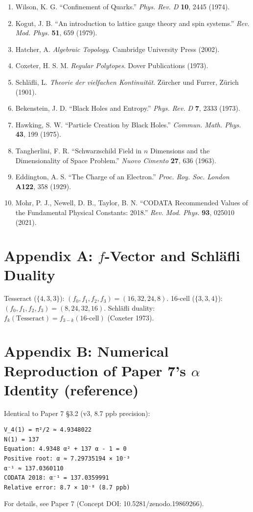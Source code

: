 \documentclass[a4paper,11pt]{article}
\begin{document}
\begin{enumerate}
\item Wilson, K. G. ``Confinement of Quarks.'' \textit{Phys. Rev. D} \textbf{10}, 2445 (1974).
\item Kogut, J. B. ``An introduction to lattice gauge theory and spin systems.'' \textit{Rev. Mod. Phys.} \textbf{51}, 659 (1979).
\item Hatcher, A. \textit{Algebraic Topology}. Cambridge University Press (2002).
\item Coxeter, H. S. M. \textit{Regular Polytopes}. Dover Publications (1973).
\item Schl\"afli, L. \textit{Theorie der vielfachen Kontinuit\"at}. Z\"urcher und Furrer, Z\"urich (1901).
\item Bekenstein, J. D. ``Black Holes and Entropy.'' \textit{Phys. Rev. D} \textbf{7}, 2333 (1973).
\item Hawking, S. W. ``Particle Creation by Black Holes.'' \textit{Commun. Math. Phys.} \textbf{43}, 199 (1975).
\item Tangherlini, F. R. ``Schwarzschild Field in $n$ Dimensions and the Dimensionality of Space Problem.'' \textit{Nuovo Cimento} \textbf{27}, 636 (1963).
\item Eddington, A. S. ``The Charge of an Electron.'' \textit{Proc. Roy. Soc. London} \textbf{A122}, 358 (1929).
\item Mohr, P. J., Newell, D. B., Taylor, B. N. ``CODATA Recommended Values of the Fundamental Physical Constants: 2018.'' \textit{Rev. Mod. Phys.} \textbf{93}, 025010 (2021).
\end{enumerate}

\section*{Appendix A: $f$-Vector and Schl\"afli Duality}

Tesseract ($\{4,3,3\}$): $(f_0, f_1, f_2, f_3) = (16, 32, 24, 8)$.
16-cell ($\{3,3,4\}$): $(f_0, f_1, f_2, f_3) = (8, 24, 32, 16)$.
Schl\"afli duality: $f_k(\text{Tesseract}) = f_{3-k}(\text{16-cell})$ (Coxeter 1973).

\section*{Appendix B: Numerical Reproduction of Paper 7's $\alpha$ Identity (reference)}

Identical to Paper 7 §3.2 (v3, 8.7 ppb precision):

\begin{verbatim}
V_4(1) = π²/2 ≈ 4.9348022
N(1) = 137
Equation: 4.9348 α² + 137 α - 1 = 0
Positive root: α ≈ 7.29735194 × 10⁻³
α⁻¹ ≈ 137.0360110
CODATA 2018: α⁻¹ = 137.0359991
Relative error: 8.7 × 10⁻⁸ (8.7 ppb)
\end{verbatim}

For details, see Paper 7 (Concept DOI: 10.5281/zenodo.19869266).
\end{document}
